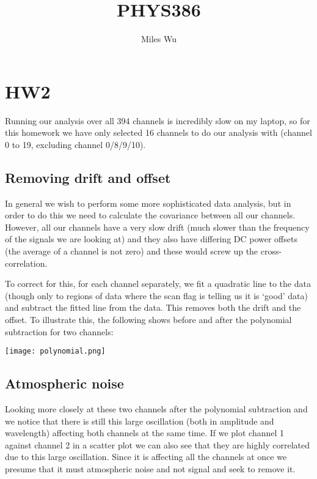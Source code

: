 \documentclass[12pt]{article}
\begin{document}
\title{PHYS386}
\author{Miles Wu}
\maketitle

\section{HW2}
Running our analysis over all 394 channels is incredibly slow on my laptop, so for this homework we have only selected 16 channels to do our analysis with (channel 0 to 19, excluding channel 0/8/9/10).

\subsection{Removing drift and offset}
In general we wish to perform some more sophisticated data analysis, but in order to do this we need to calculate the covariance between all our channels.
However, all our channels have a very slow drift (much slower than the frequency of the signals we are looking at) and they also have differing DC power offsets (the average of a channel is not zero) and these would screw up the cross-correlation.

To correct for this, for each channel separately, we fit a quadratic line to the data (though only to regions of data where the scan flag is telling us it is `good' data) and subtract the fitted line from the data.
This removes both the drift and the offset.
To illustrate this, the following shows before and after the polynomial subtraction for two channels:

\begin{center}
\texttt{[image: polynomial.png]}
\end{center}

\subsection{Atmospheric noise}
Looking more closely at these two channels after the polynomial subtraction and we notice that there is still this large oscillation (both in amplitude and wavelength) affecting both channels at the same time.
If we plot channel 1 against channel 2 in a scatter plot we can also see that they are highly correlated due to this large oscillation.
Since it is affecting all the channels at once we presume that it must atmospheric noise and not signal and seek to remove it.
\end{document}
